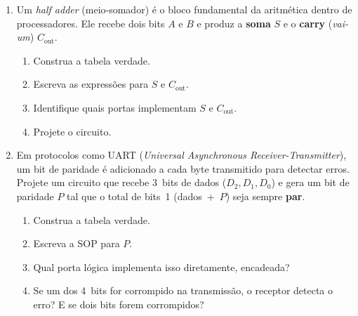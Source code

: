 \documentclass[11pt, a4paper]{article}
\begin{document}
\begin{enumerate}
\newpage
\item Um \emph{half adder} (meio-somador) \'{e} o bloco fundamental da aritm\'{e}tica dentro de processadores. Ele recebe dois bits $A$ e $B$ e produz a \textbf{soma} $S$ e o \textbf{carry} (\emph{vai-um}) $C_{\text{out}}$.
\begin{enumerate}
  \item Construa a tabela verdade.
  \item Escreva as express\~{o}es para $S$ e $C_{\text{out}}$.
  \item Identifique quais portas implementam $S$ e $C_{\text{out}}$.
  \item Projete o circuito.
\end{enumerate}

\item Em protocolos como UART (\emph{Universal Asynchronous Receiver-Transmitter}), um bit de paridade \'{e} adicionado a cada byte transmitido para detectar erros. Projete um circuito que recebe 3~bits de dados ($D_2, D_1, D_0$) e gera um bit de paridade $P$ tal que o total de bits~1 (dados~+~$P$) seja sempre \textbf{par}.
\begin{enumerate}
  \item Construa a tabela verdade.
  \item Escreva a SOP para $P$.
  \item Qual porta l\'{o}gica implementa isso diretamente, encadeada?
  \item Se um dos 4~bits for corrompido na transmiss\~{a}o, o receptor detecta o erro? E se dois bits forem corrompidos?
\end{enumerate}


\end{enumerate}
\end{document}
